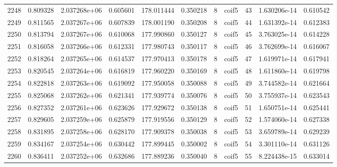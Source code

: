 \begin{tabular}{lrrrrrrlrrr}
2248 &    0.809328 &        2.037268e+06 &  0.605601 &              178.011444 &    0.350218 &       8 &        coif5 &     43 &   1.630206e-14 &      0.610542 \\
2249 &    0.811565 &        2.037267e+06 &  0.607839 &              178.001190 &    0.350208 &       8 &        coif5 &     44 &   1.631392e-14 &      0.612383 \\
2250 &    0.813794 &        2.037267e+06 &  0.610068 &              177.990860 &    0.350127 &       8 &        coif5 &     45 &   3.763025e-14 &      0.614228 \\
2251 &    0.816058 &        2.037266e+06 &  0.612331 &              177.980743 &    0.350117 &       8 &        coif5 &     46 &   3.762699e-14 &      0.616067 \\
2252 &    0.818264 &        2.037265e+06 &  0.614537 &              177.970413 &    0.350178 &       8 &        coif5 &     47 &   1.619971e-14 &      0.617941 \\
2253 &    0.820545 &        2.037264e+06 &  0.616819 &              177.960220 &    0.350169 &       8 &        coif5 &     48 &   1.611860e-14 &      0.619798 \\
2254 &    0.822818 &        2.037263e+06 &  0.619092 &              177.950058 &    0.350088 &       8 &        coif5 &     49 &   3.744582e-14 &      0.621664 \\
2255 &    0.825068 &        2.037262e+06 &  0.621341 &              177.939774 &    0.350076 &       8 &        coif5 &     50 &   3.755937e-14 &      0.623543 \\
2256 &    0.827352 &        2.037261e+06 &  0.623626 &              177.929672 &    0.350138 &       8 &        coif5 &     51 &   1.650751e-14 &      0.625441 \\
2257 &    0.829605 &        2.037259e+06 &  0.625879 &              177.919556 &    0.350129 &       8 &        coif5 &     52 &   1.574060e-14 &      0.627338 \\
2258 &    0.831895 &        2.037258e+06 &  0.628170 &              177.909378 &    0.350038 &       8 &        coif5 &     53 &   3.659789e-14 &      0.629239 \\
2259 &    0.834167 &        2.037254e+06 &  0.630442 &              177.899445 &    0.350002 &       8 &        coif5 &     54 &   3.301110e-14 &      0.631126 \\
2260 &    0.836411 &        2.037252e+06 &  0.632686 &              177.889236 &    0.350040 &       8 &        coif5 &     55 &   8.224438e-15 &      0.633014 \\

\end{tabular}
